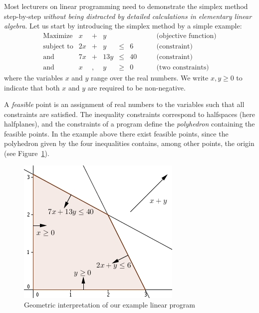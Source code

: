 \documentclass[ukenglish]{nik}
\begin{document}
Most lecturers on linear programming need to demonstrate the simplex method step-by-step 
\emph{without being distracted by detailed calculations in elementary linear algebra}. Let us start by
introducing the simplex method by a simple example:
\[
    \begin{array}{lrcrcrl}
			\text{Maximize}  &    x &+&    y &	&	& \quad\quad \text{(objective function)}\\
			\text{subject to}&  2 x &+&    y &\leq&   6	& \quad\quad \text{(constraint)}\\
    	\text{and}&         7 x &+& 13 y &\leq&  40 & \quad\quad \text{(constraint)}\\
    	\text{and}       &    x &,&    y &\geq&0    &\quad\quad \text{(two constraints)}
    \end{array}
\]
where the variables $x$ and $y$ range over the real numbers. We write $x,y \geq 0$ to indicate that both $x$ and $y$ are required to be non-negative.

A \emph{feasible} point is an assignment of real numbers to the variables 
such that all constraints are satisfied. 
The inequality constraints correspond to halfspaces (here halfplanes), and the constraints of a program 
define the \emph{polyhedron} containing the feasible points.
In the example above there exist feasible points,
since the polyhedron given by the four inequalities contains,
among other points, the origin  (see Figure~\ref{fig:ex1}). 

\begin{figure}[htb]
	\begin{center}
		\includegraphics{ex1.jpg}
	\end{center}
	\caption{Geometric interpretation of our example linear program}
	\label{fig:ex1}
\end{figure}
\end{document}
